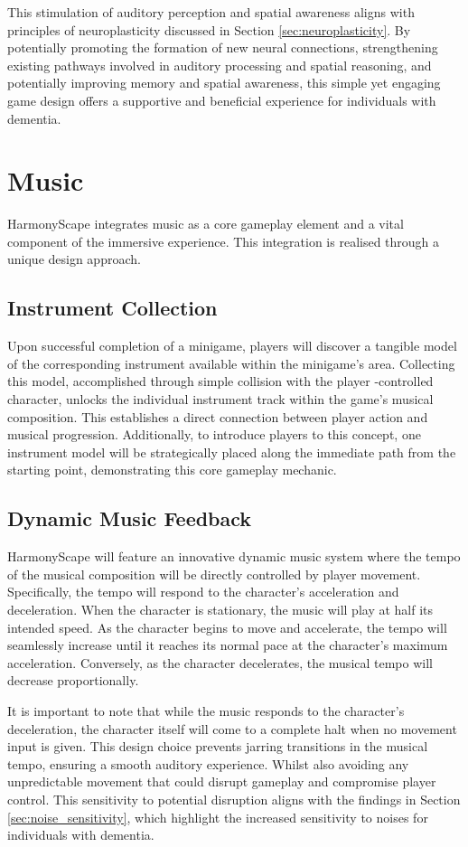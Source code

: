 \documentclass{l4proj}
\begin{document}
This stimulation of auditory perception and spatial awareness aligns with principles of neuroplasticity discussed in Section \ref{sec:neuroplasticity}. By potentially promoting the formation of new neural connections, strengthening existing pathways involved in auditory processing and spatial reasoning, and potentially improving memory and spatial awareness, this simple yet engaging game design offers a supportive and beneficial experience for individuals with dementia.

\section{Music}
HarmonyScape integrates music as a core gameplay element and a vital component of the immersive experience. This integration is realised through a unique design approach.

\subsection{Instrument Collection}
Upon successful completion of a minigame, players will discover a tangible model of the corresponding instrument available within the minigame's area. Collecting this model, accomplished through simple collision with the player -controlled character, unlocks the individual instrument track within the game's musical composition. This establishes a direct connection between player action and musical progression. Additionally, to introduce players to this concept, one instrument model will be strategically placed along the immediate path from the starting point, demonstrating this core gameplay mechanic.

\subsection{Dynamic Music Feedback}

HarmonyScape will feature an innovative dynamic music system where the tempo of the musical composition will be directly controlled by player movement.  Specifically, the tempo will respond to the character's acceleration and deceleration. When the character is stationary, the music will play at half its intended speed. As the character begins to move and accelerate, the tempo will seamlessly increase until it reaches its normal pace at the character's maximum acceleration. Conversely, as the character decelerates, the musical tempo will decrease proportionally.

It is important to note that while the music responds to the character's deceleration, the character itself will come to a complete halt when no movement input is given. This design choice prevents jarring transitions in the musical tempo, ensuring a smooth auditory experience. Whilst also avoiding any unpredictable movement that could disrupt gameplay and compromise player control. This sensitivity to potential disruption aligns with the findings in Section \ref{sec:noise_sensitivity}, which highlight the increased sensitivity to noises for individuals with dementia.
\end{document}
